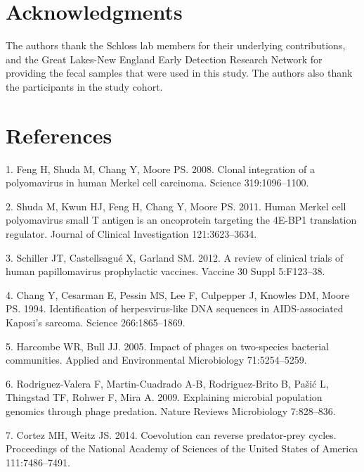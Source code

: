 \documentclass[12pt,]{article}
\begin{document}
\section{Acknowledgments}\label{acknowledgments}

The authors thank the Schloss lab members for their underlying
contributions, and the Great Lakes-New England Early Detection Research
Network for providing the fecal samples that were used in this study.
The authors also thank the participants in the study cohort.

\newpage

\section{References}\label{references}

\hypertarget{refs}{}
\hypertarget{ref-Feng:2008kr}{}
1. Feng H, Shuda M, Chang Y, Moore PS. 2008. Clonal integration of a
polyomavirus in human Merkel cell carcinoma. Science 319:1096--1100.

\hypertarget{ref-Shuda:2011gf}{}
2. Shuda M, Kwun HJ, Feng H, Chang Y, Moore PS. 2011. Human Merkel cell
polyomavirus small T antigen is an oncoprotein targeting the 4E-BP1
translation regulator. Journal of Clinical Investigation 121:3623--3634.

\hypertarget{ref-Schiller:2012ba}{}
3. Schiller JT, Castellsagué X, Garland SM. 2012. A review of clinical
trials of human papillomavirus prophylactic vaccines. Vaccine 30 Suppl
5:F123--38.

\hypertarget{ref-Chang:1994up}{}
4. Chang Y, Cesarman E, Pessin MS, Lee F, Culpepper J, Knowles DM, Moore
PS. 1994. Identification of herpesvirus-like DNA sequences in
AIDS-associated Kaposi's sarcoma. Science 266:1865--1869.

\hypertarget{ref-Harcombe:2005fd}{}
5. Harcombe WR, Bull JJ. 2005. Impact of phages on two-species bacterial
communities. Applied and Environmental Microbiology 71:5254--5259.

\hypertarget{ref-RodriguezValera:2009cr}{}
6. Rodriguez-Valera F, Martin-Cuadrado A-B, Rodriguez-Brito B, Pašić L,
Thingstad TF, Rohwer F, Mira A. 2009. Explaining microbial population
genomics through phage predation. Nature Reviews Microbiology
7:828--836.

\hypertarget{ref-Cortez:2014bk}{}
7. Cortez MH, Weitz JS. 2014. Coevolution can reverse predator-prey
cycles. Proceedings of the National Academy of Sciences of the United
States of America 111:7486--7491.
\end{document}
